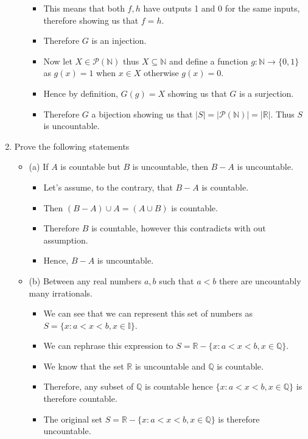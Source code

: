 \documentclass[letterpaper,12pt]{article}
\begin{document}
\begin{enumerate}
\begin{itemize}
\begin{itemize}
	\item This means that both $f,h$ have outputs 1 and 0 for the same inputs, therefore showing us that $f=h$.
	\item Therefore $G$ is an injection.
	\item Now let $X \in  \mathcal{P}(\mathbb{N})$ thus $X \subseteq \mathbb{N}$ and define a function $g : \mathbb{N} \rightarrow \{0,1\}$ as $g(x) = 1$ when $x\in X$ otherwise $g(x) = 0.$
	\item Hence by definition, $G(g)=X$ showing us that $G$ is a surjection.
	\item Therefore $G$ a bijection showing us that $|S| = |\mathcal{P}(\mathbb{N}) | = |\mathbb{R}|$. Thus $S$ is uncountable.
\end{itemize}
\end{itemize}
\item Prove the following statements
\begin{itemize}
	\item (a) If $A$ is countable but $B$ is uncountable, then $B-A$ is uncountable.
	\begin{itemize}
	\item Let's assume, to the contrary, that $B-A$ is countable.
	\item Then $(B-A) \cup A = (A\cup B)$ is countable.
	\item Therefore $B$ is countable, however this contradicts with out assumption.
	\item Hence, $B-A$ is uncountable.
	\end{itemize}
	\item (b) Between any real numbers $a,b$ such that $a<b$ there are uncountably many irrationals.
	\begin{itemize}
	\item We can see that we can represent this set of numbers as $S = \{x: a<x<b, x\in \mathbb{I}\}$.
	\item We can rephrase this expression to $S = \mathbb{R} - \{x:a<x<b, x\in \mathbb{Q}\}.$
	\item We know that the set $\mathbb{R}$ is uncountable and $\mathbb{Q}$ is countable.
	\item Therefore, any subset of $\mathbb{Q}$ is countable hence $\{x:a<x<b,x\in \mathbb{Q}\}$ is therefore countable.
	\item The original set $S = \mathbb{R} - \{x : a<x<b,x\in \mathbb{Q}\}$ is therefore uncountable. 
	\end{itemize}
\end{itemize}

\end{enumerate}
\end{document}

